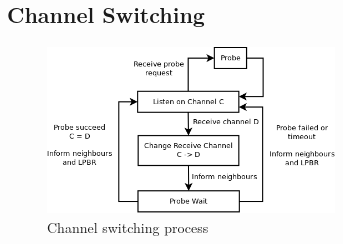 



\subsection{Channel Switching}



\begin{figure}
\centering
\includegraphics[width=3in]{Diagram1}
\caption{Channel switching process}
\label{fig_sim}
\end{figure}

